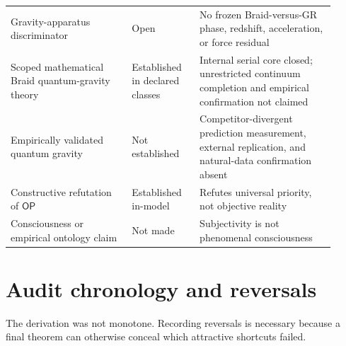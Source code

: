 \documentclass[11pt]{article}
\theoremstyle{definition}
\theoremstyle{remark}
\newcommand{\OPT}{\mathsf{OP}}
\begin{document}
\begin{longtable}{>{\raggedright\arraybackslash}p{0.34\linewidth} >{\raggedright\arraybackslash}p{0.19\linewidth} >{\raggedright\arraybackslash}p{0.38\linewidth}}
Gravity-apparatus discriminator & Open & No frozen Braid-versus-GR phase, redshift, acceleration, or force residual \\
Scoped mathematical Braid quantum-gravity theory & Established in declared classes & Internal serial core closed; unrestricted continuum completion and empirical confirmation not claimed \\
Empirically validated quantum gravity & Not established & Competitor-divergent prediction measurement, external replication, and natural-data confirmation absent \\
Constructive refutation of $\OPT$ & Established in-model & Refutes universal priority, not objective reality \\
Consciousness or empirical ontology claim & Not made & Subjectivity is not phenomenal consciousness \\
\bottomrule
\end{longtable}

\section{Audit chronology and reversals}

The derivation was not monotone. Recording reversals is necessary because a final theorem can otherwise conceal which attractive shortcuts failed.
\end{document}

